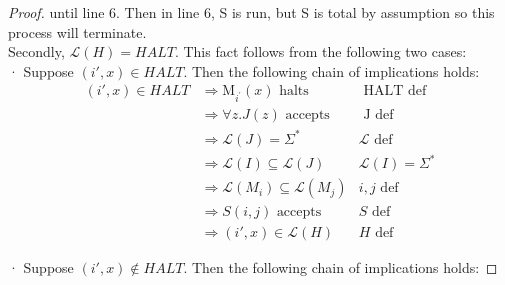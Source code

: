 \documentclass[10pt]{article}
\begin{document}
\begin{enumerate}[label={}]
\begin{proof}
                  until line 6. Then in line 6, S is run, but S is total by assumption so this process
                  will terminate. \\
                  Secondly, $\mathcal{L}(H)=H A L T$. This fact follows from the following two cases:\\
                  · Suppose $(i', x) \in H A L T$. Then the following chain of implications holds:
                  $$
                        \begin{array}{rlr}
                              (i', x) \in H A L T & \Longrightarrow \text{M}_{i^{\prime}}(x) \text { halts }                         & \text { HALT def }        \\
                                                  & \Longrightarrow \forall z. J(z) \text { accepts }                                & \text { J def }           \\
                                                  & \Longrightarrow \mathcal{L}(J)=\Sigma^*                                          & \mathcal{L} \text { def } \\
                                                  & \Longrightarrow \mathcal{L}(I) \subseteq \mathcal{L}(J)                          & \mathcal{L}(I)=\Sigma^*   \\
                                                  & \Longrightarrow \mathcal{L}\left(M_i\right)\subseteq \mathcal{L}\left(M_j\right) & i, j \text { def }        \\
                                                  & \Longrightarrow S(i, j) \text { accepts }                                        & S \text { def }           \\
                                                  & \Longrightarrow(i', x) \in \mathcal{L}(H)                                        & H \text { def }
                        \end{array}
                  $$

                  · Suppose $(i', x) \notin H A L T$. Then the following chain of implications holds:


\end{proof}
\end{enumerate}
\end{document}
